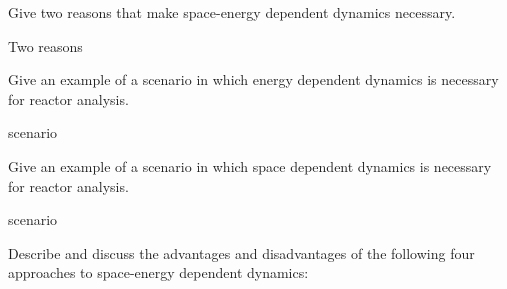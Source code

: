 \documentclass[11pt,addpoints]{exam}
\begin{document}
\begin{questions}

        \question[20] Give two reasons that make space-energy dependent 
        dynamics necessary. 
                \begin{solution}
                        Two reasons
                \end{solution}


        \question[10] Give an example of a scenario in which energy dependent 
        dynamics is necessary for reactor analysis.
                \begin{solution}
                        scenario
                \end{solution}



        \question[10] Give an example of a scenario in which space dependent 
        dynamics is necessary for reactor analysis.
                \begin{solution}
                        scenario
                \end{solution}




        \question Describe and discuss the advantages and disadvantages of the 
        following four approaches to space-energy dependent dynamics:
\end{questions}
\end{document}
